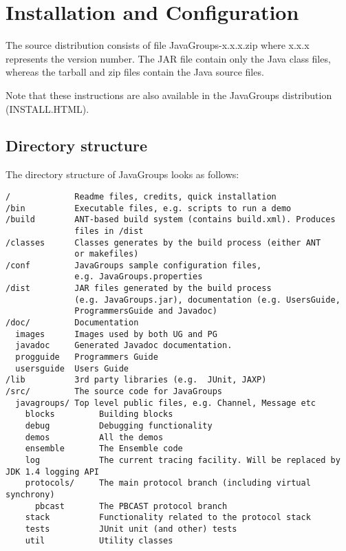 
\chapter{Installation and Configuration} \label{Installation}

The source distribution consists of file JavaGroups-x.x.x.zip where x.x.x represents
the version number. The JAR file contain only the Java class files, whereas the
tarball and zip files contain the Java source files.
	
Note that these instructions are also available in the JavaGroups distribution (INSTALL.HTML).

  \section{Directory structure}

  The directory structure of JavaGroups looks as follows:

  \begin{small}
  \begin{verbatim}
/             Readme files, credits, quick installation
/bin          Executable files, e.g. scripts to run a demo
/build        ANT-based build system (contains build.xml). Produces
              files in /dist
/classes      Classes generates by the build process (either ANT
              or makefiles)
/conf         JavaGroups sample configuration files,
              e.g. JavaGroups.properties
/dist         JAR files generated by the build process
              (e.g. JavaGroups.jar), documentation (e.g. UsersGuide,
              ProgrammersGuide and Javadoc)
/doc/         Documentation
  images      Images used by both UG and PG
  javadoc     Generated Javadoc documentation.
  progguide   Programmers Guide
  usersguide  Users Guide
/lib          3rd party libraries (e.g.  JUnit, JAXP)
/src/         The source code for JavaGroups
  javagroups/ Top level public files, e.g. Channel, Message etc
    blocks         Building blocks
    debug          Debugging functionality
    demos          All the demos
    ensemble       The Ensemble code
    log	           The current tracing facility. Will be replaced by JDK 1.4 logging API    
    protocols/	   The main protocol branch (including virtual synchrony)
      pbcast       The PBCAST protocol branch
    stack          Functionality related to the protocol stack
    tests          JUnit unit (and other) tests
    util           Utility classes
  \end{verbatim}
  \end{small}

